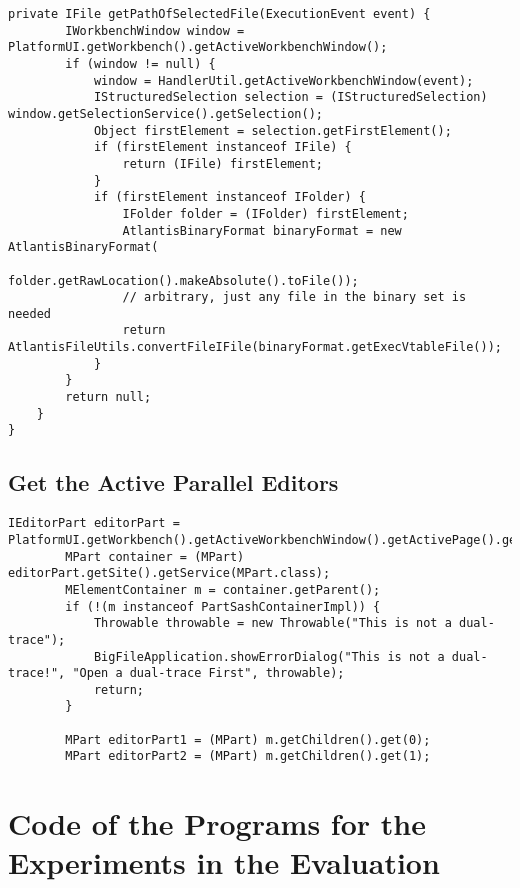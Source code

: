 \begin{lstlisting}[caption= code in OpenDualEditorsHandler.java]
	private IFile getPathOfSelectedFile(ExecutionEvent event) {
		IWorkbenchWindow window = PlatformUI.getWorkbench().getActiveWorkbenchWindow();
		if (window != null) {
			window = HandlerUtil.getActiveWorkbenchWindow(event);
			IStructuredSelection selection = (IStructuredSelection) window.getSelectionService().getSelection();
			Object firstElement = selection.getFirstElement();
			if (firstElement instanceof IFile) {
				return (IFile) firstElement;
			}
			if (firstElement instanceof IFolder) {
				IFolder folder = (IFolder) firstElement;
				AtlantisBinaryFormat binaryFormat = new AtlantisBinaryFormat(
						folder.getRawLocation().makeAbsolute().toFile());
				// arbitrary, just any file in the binary set is needed
				return AtlantisFileUtils.convertFileIFile(binaryFormat.getExecVtableFile());
			}
		}
		return null;
	}
}
\end{lstlisting}

\subsection{Get the Active Parallel Editors}
\begin{lstlisting}[caption= code for getting parallel editors ]
IEditorPart editorPart = PlatformUI.getWorkbench().getActiveWorkbenchWindow().getActivePage().getActiveEditor();
		MPart container = (MPart) editorPart.getSite().getService(MPart.class);
		MElementContainer m = container.getParent();
		if (!(m instanceof PartSashContainerImpl)) {
			Throwable throwable = new Throwable("This is not a dual-trace");
			BigFileApplication.showErrorDialog("This is not a dual-trace!", "Open a dual-trace First", throwable);
			return;
		}

		MPart editorPart1 = (MPart) m.getChildren().get(0);
		MPart editorPart2 = (MPart) m.getChildren().get(1);
\end{lstlisting}

\section{Code of the Programs for the Experiments in the Evaluation}\label{expcode}


